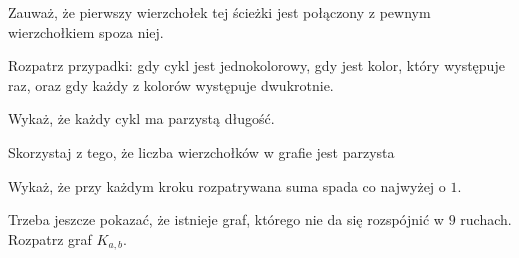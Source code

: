 
\begin{hints_list}
	\item Zauważ, że pierwszy wierzchołek tej ścieżki jest połączony z pewnym wierzchołkiem spoza niej.
	\item Rozpatrz przypadki: gdy cykl jest jednokolorowy, gdy jest kolor, który występuje raz, oraz gdy każdy z kolorów występuje dwukrotnie.
	\item Wykaż, że każdy cykl ma parzystą długość.
	\item Skorzystaj z tego, że liczba wierzchołków w grafie jest parzysta
	\item Wykaż, że przy każdym kroku rozpatrywana suma spada co najwyżej o $1$.
	\item Trzeba jeszcze pokazać, że istnieje graf, którego nie da się rozspójnić w $9$ ruchach. Rozpatrz graf $K_{a, b}$.
\end{hints_list}